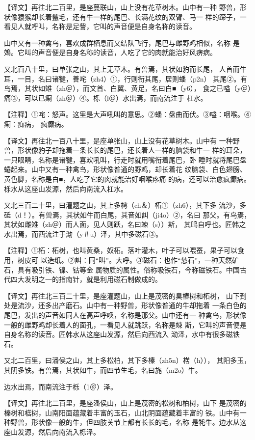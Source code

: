 \documentclass[a4paper,12pt,UTF8,twoside]{ctexbook}
\begin{document}
【译文】再往北二百里，是座蔓联山，山上没有花草树木。山中有一种 野兽，形状像猿猴却长着鬣毛，还有牛一样的尾巴、长满花纹的双臂、马一 样的蹄子，一看见人就呼叫，名称是足訾，它叫的声音便是自身名称的读音。

山中又有一种禽鸟，喜欢成群栖息而又结队飞行，尾巴与雌野鸡相似，名称 是鵁。它叫的声音便是自身名称的读音，人吃了它的肉就能治好风痹病。

又北百八十里，曰单张之山，其上无草木。有兽焉，其状如豹而长尾， 人首而牛耳，一目，名曰诸犍，善咤（zh4）①，行则衔其尾，居则蟠（p2n） 其尾②。有鸟焉，其状如雉（zh＠），而文首、白翼、黄足，名曰白■（y6）， 食之已嗌（y＠）痛③，可以已痸（zh＠）④。栎（l＠）水出焉，而南流注于 杠水。

【注释】①咤：怒声。这里是大声吼叫的意思。②蟠：盘曲而伏。③嗌：咽喉。④痸：痴病， 疯癫病。

【译文】再往北一百八十里，是座单张山，山上没有花草树木。山中有 一种野兽，形状像豹子却拖着一条长长的尾巴，还长着人一样的脑袋和牛一 样的耳朵，一只眼睛，名称是诸犍，喜欢吼叫，行走时就用嘴衔着尾巴，卧 睡时就将尾巴盘蜷起来。山中又有一种禽鸟，形状像普通的野鸡，却长着花 纹脑袋、白色翅膀、黄色脚，名称是白■，人吃了它的肉就能治好咽喉疼痛 的病，还可以治愈疯癫病。栎水从这座山发源，然后向南流入杠水。

又北三百二十里，曰灌题之山，其上多樗（ch＆）柘①（zh6），其下多 流沙，多砥（d！）。有兽焉，其状如牛而白尾，其音如訆（ji4o）②，名曰 那父。有鸟焉，其状如雌雉（zh＠）而人面，见人则跃，名曰竦（s））斯， 其鸣自呼也。匠韩之水出焉，而西流注于泑（y＃u）泽，其中多磁石③。

【注释】①柘：柘树，也叫黄桑，奴柘。落叶灌木，叶子可以喂蚕，果子可以食用，树皮可 以造纸。②訆：同“叫”。大呼。③磁石：也作“慈石”，一种天然矿石，具有吸引铁、镍、钴等金 属物质的属性。俗称吸铁石，今称磁铁石。中国古代四大发明之一的指南针，就是利用磁石制做成的。

【译文】再往北三百二十里，是座灌题山，山上是茂密的臭椿树和柘树， 山下到处是流沙，还多出产磨石。山中有一种野兽，形状像普通的牛却拖着 一条白色的尾巴，发出的声音如同人在高声呼唤，名称是那父。山中还有一 种禽鸟，形状像一般的雌野鸡却长着人的面孔，一看见人就跳跃，名称是竦 斯，它叫的声音便是自身名称的读音。匠韩水从这座山发源，然后向西流入 泑泽，水中有很多磁铁石。

又北二百里，曰潘侯之山，其上多松柏，其下多榛（zh5n）楛（h））， 其阳多玉，其阴多铁。有兽焉，其状如牛，而四节生毛，名曰旄（m2o）牛。

边水出焉，而南流注于栎（1＠）泽。

【译文】再往北二百里，是座潘侯山，山上是茂密的松树和柏树，山下 是茂密的榛树和楛树，山南阳面蕴藏着丰富的玉石，山北阴面蕴藏着丰富的 铁。山中有一种野兽，形状像一般的牛，但四肢关节上都有长长的毛，名称 是牦牛。边水从这座山发源，然后向南流入栎泽。
\end{document}
